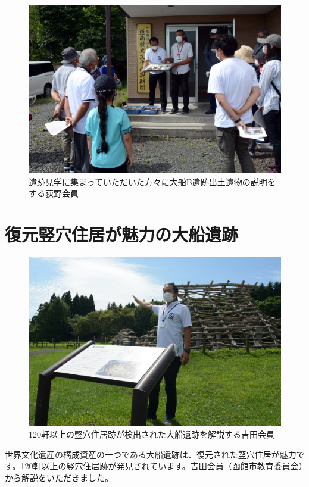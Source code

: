 \documentclass[a4j,11pt,twocolumn,openany]{jsbook}
\begin{document}
\begin{figure}[ht]
	\centering
	\includegraphics[width=\linewidth]{fig/01_Iseki_kengaku/01_Opening.JPG}
	\caption{遺跡見学に集まっていただいた方々に大船B遺跡出土遺物の説明をする荻野会員}
	\label{}
\end{figure}

\section{復元竪穴住居が魅力の大船遺跡}

\begin{figure}[ht]
	\centering
	\includegraphics[width=\linewidth]{fig/01_Iseki_kengaku/02_Ofune.JPG}
	\caption{120軒以上の竪穴住居跡が検出された大船遺跡を解説する吉田会員}
	\label{}
\end{figure}

世界文化遺産の構成資産の一つである大船遺跡は、復元された竪穴住居が魅力です。120軒以上の竪穴住居跡が発見されています。吉田会員（函館市教育委員会）から解説をいただきました。
\end{document}
